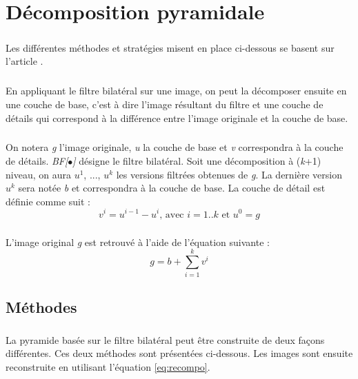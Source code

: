 \documentclass[twoside,UTF8]{EPURapport}
\begin{document}
\chapter{Décomposition pyramidale}

\paragraph{}
Les différentes méthodes et stratégies misent en place ci-dessous se basent sur l'article \cite{decompo}. 

\paragraph{}
En appliquant le filtre bilatéral sur une image, on peut la décomposer ensuite en une couche de base, c'est à dire l'image résultant du filtre et une couche de détails qui correspond à la différence entre l'image originale et la couche de base. 
\paragraph{}
On notera \textit{g} l'image originale, \textit{u} la couche de base et \textit{v} correspondra à la couche de détails. \textit{BF[$\bullet$]} désigne le filtre bilatéral. 
Soit une décomposition à (\textit{k}+1) niveau, on aura \textit{$u^1$}, ..., \textit{$u^k$} les versions filtrées obtenues de \textit{g}. La dernière version \textit{$u^k$} sera notée \textit{b} et correspondra à la couche de base.
La couche de détail est définie comme suit : 
\begin{equation}
	v^i = u^{i-1} - u^i \textrm{, avec }i=1..k \textrm{ et } u^0=g
\end{equation}

\paragraph{}
L'image original \textit{g} est retrouvé à l'aide de l'équation suivante : 
\begin{equation}
\label{eq:recompo}
	g = b + \sum_{i=1}^{k}v^i
\end{equation}

	\section{Méthodes}

\paragraph{}
La pyramide basée sur le filtre bilatéral peut être construite de deux façons différentes. Ces deux méthodes sont présentées ci-dessous. Les images sont ensuite reconstruite en utilisant l'équation \ref{eq:recompo}.
\end{document}
